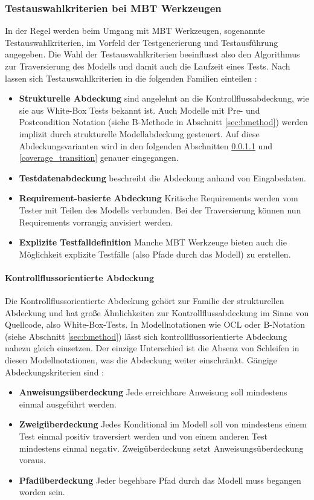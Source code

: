 \subsubsection{Testauswahlkriterien bei \Gls{MBT} Werkzeugen}
In der Regel werden beim Umgang mit \Gls{MBT} Werkzeugen, sogenannte Testauswahlkriterien, im Vorfeld der Testgenerierung und Testausführung angegeben. Die Wahl der Testauswahlkriterien beeinflusst also den Algorithmus zur Traversierung des Modells und damit auch die Laufzeit eines Tests. Nach \citeauthor{utting_practical_2007} lassen sich Testauswahlkriterien in die folgenden Familien einteilen \cite{utting_practical_2007}:

\begin{itemize}
\item \textbf{Strukturelle Abdeckung} sind angelehnt an die Kontrollflussabdeckung, wie sie aus White-Box Tests bekannt ist. Auch Modelle mit Pre- und Postcondition Notation (siehe B-Methode in Abschnitt \ref{sec:bmethod}) werden implizit durch strukturelle Modellabdeckung gesteuert. Auf diese Abdeckungsvarianten wird in den folgenden Abschnitten \ref{coverage_control} und \ref{coverage_transition} genauer eingegangen.
\item \textbf{Testdatenabdeckung} beschreibt die Abdeckung anhand von Eingabedaten.
\item \textbf{Requirement-basierte Abdeckung} Kritische Requirements werden vom Tester mit Teilen des Modells verbunden. Bei der Traversierung können nun Requirements vorrangig anvisiert werden.
\item \textbf{Explizite Testfalldefinition} Manche \Gls{MBT} Werkzeuge bieten auch die Möglichkeit explizite Testfälle (also Pfade durch das Modell) zu erstellen.
\end{itemize}

\paragraph{Kontrollflussorientierte Abdeckung}\label{coverage_control} Die Kontrollflussorientierte Abdeckung gehört zur Familie der strukturellen Abdeckung und hat große Ähnlichkeiten zur Kontrollflussabdeckung im Sinne von Quellcode, also White-Box-Tests. In Modellnotationen wie OCL \cite{warmer_object_2004} oder B-Notation (siehe Abschnitt \ref{sec:bmethod}) lässt sich kontrollflussorientierte Abdeckung nahezu gleich einsetzen. Der einzige Unterschied ist die Absenz von Schleifen in diesen Modellnotationen, was die Abdeckung weiter einschränkt. Gängige Abdeckungskriterien sind \cite{rossner_basiswissen_2010}:
\begin{itemize}
\item \textbf{Anweisungsüberdeckung} Jede erreichbare Anweisung soll mindestens einmal ausgeführt werden.
\item \textbf{Zweigüberdeckung} Jedes Konditional im Modell soll von mindestens einem Test einmal positiv traversiert werden und von einem anderen Test mindestens einmal negativ. Zweigüberdeckung setzt Anweisungsüberdeckung voraus.
\item \textbf{Pfadüberdeckung} Jeder begehbare Pfad durch das Modell muss begangen worden sein.
\end{itemize}

